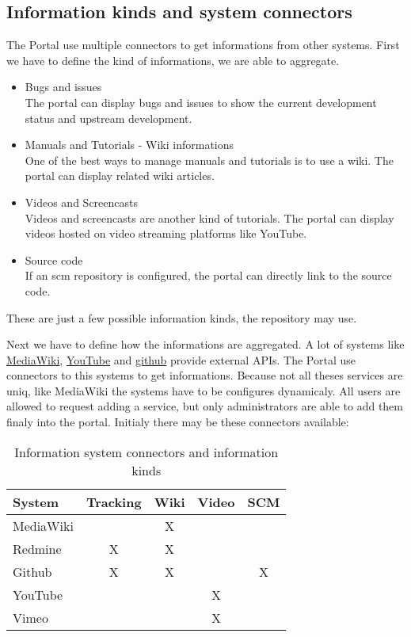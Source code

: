 \subsection[sec:information kinds and system connectors]{Information kinds and system connectors}

The Portal use multiple connectors to get informations from other systems.
First we have to define the kind of informations, we are able to aggregate.

\begin{itemize}
\item Bugs and issues\\
The portal can display bugs and issues to show the current development status and upstream development.
\item Manuals and Tutorials - Wiki informations\\
One of the best ways to manage manuals and tutorials is to use a wiki. The portal can display related wiki articles.
\item Videos and Screencasts\\
Videos and screencasts are another kind of tutorials. The portal can display videos hosted on video streaming platforms like YouTube.
\item Source code\\
If an scm repository is configured, the portal can directly link to the source code.
\end{itemize}

These are just a few possible information kinds, the repository may use.

Next we have to define how the informations are aggregated.
A lot of systems like \hyperlink{http://www.mediawiki.org/wiki/API:Main_page/de}{MediaWiki}, \hyperlink{http://code.google.com/intl/de-DE/apis/youtube/overview.html}{YouTube} and \hyperlink{http://developer.github.com/v3/}{github} provide external APIs.
The Portal use connectors to this systems to get informations.
Because not all theses services are uniq, like MediaWiki the systems have to be configures dynamicaly.
All users are allowed to request adding a service, but only administrators are able to add them finaly into the portal.
Initialy there may be these connectors available:

\small
\begin{longtable}{|p{}|c|c|c|c}
\caption{Information system connectors and information kinds} \\
\hline
\label{tab:information system connectors and information kinds}
\textbf{System} & \textbf{Tracking} & \textbf{Wiki} & \textbf{Video} & \textbf{SCM}
\\ \hline
 MediaWiki & & X & &
\\ \hline
 Redmine & X & X & &
\\ \hline
 Github & X & X & & X
\\ \hline
 YouTube & & & X &
\\ \hline
 Vimeo & & & X &
\\ \hline
\end{longtable}
\normalsize
